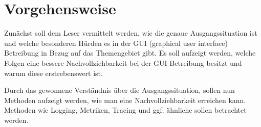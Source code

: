 %


\section{Vorgehensweise}

Zunächst soll dem Leser vermittelt werden, wie die genaue Ausgangssituation ist und welche besonderen Hürden es in der GUI (graphical user interface) Betreibung in Bezug auf das Themengebiet gibt. Es soll aufzeigt werden, welche Folgen eine bessere Nachvollziehbarkeit bei der GUI Betreibung besitzt und warum diese erstrebenswert ist.



Durch das gewonnene Verständnis über die Ausgangssituation, sollen nun Methoden aufzeigt werden, wie man eine Nachvollziehbarkeit erreichen kann. Methoden wie Logging, Metriken, Tracing und ggf. ähnliche sollen betrachtet werden.

